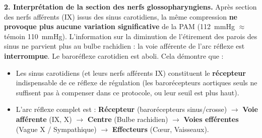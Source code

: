 \documentclass[11pt]{article}
\begin{document}
\begin{exoresolu}
\textbf{2. Interprétation de la section des nerfs glossopharyngiens.}
Après section des nerfs afférents (IX) issus des sinus carotidiens, la même compression \textbf{ne provoque plus aucune variation significative} de la PAM (\SI{112}{mmHg} $\approx$ témoin \SI{110}{mmHg}). L'information sur la diminution de l'étirement des parois des sinus ne parvient plus au bulbe rachidien : la voie afférente de l'arc réflexe est \textbf{interrompue}. Le baroréflexe carotidien est aboli.
Cela démontre que :
\begin{itemize}
\item Les sinus carotidiens (et leurs nerfs afférents IX) constituent le \textbf{récepteur} indispensable de ce réflexe de régulation (les barorécepteurs aortiques seuls ne suffisent pas à compenser dans ce protocole, ou leur seuil est plus haut).
\item L'arc réflexe complet est : \textbf{Récepteur} (barorécepteurs sinus/crosse) $\rightarrow$ \textbf{Voie afférente} (IX, X) $\rightarrow$ \textbf{Centre} (Bulbe rachidien) $\rightarrow$ \textbf{Voies efférentes} (Vague X / Sympathique) $\rightarrow$ \textbf{Effecteurs} (C\oe ur, Vaisseaux).
\end{itemize}
\end{exoresolu}
\end{document}
